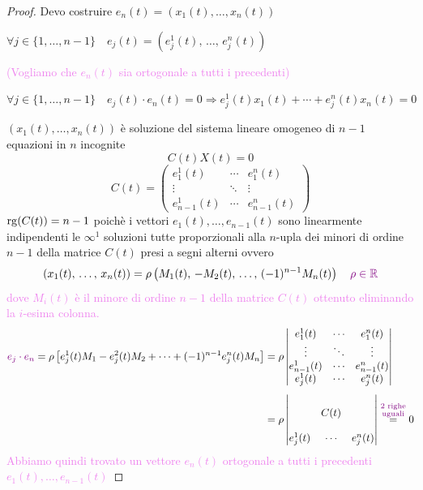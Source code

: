 \begin{proof}
        Devo costruire $e_n(t)=(x_1(t), \dots, x_n(t))$ 

        $\forall j \in \{1, \dots, n-1\} \quad e_j(t) = \left(e_j^1(t), \, \dots, \, e_j^n(t) \right)$

        \textcolor{violet}{(Vogliamo che $e_n(t)$ sia ortogonale a tutti i precedenti)} 
        
        $\forall j \in \{1, \dots, n-1\} \quad e_j(t) \cdot e_n(t) = 0 \Rightarrow e_j^1(t) x_1(t) + \cdots + e_j^n(t) x_n(t) = 0$

        $(x_1(t), \dots, x_n(t))$ è soluzione del sistema lineare omogeneo di $n-1$ equazioni in $n$ incognite
        \[ C(t)X(t)= 0 \]
        \[ C(t) = 
        \begin{pmatrix}
        e_1^1(t) & \cdots & e_1^n(t) \\
        \vdots & \ddots & \vdots \\
        e_{n-1}^1(t) & \cdots & e_{n-1}^n(t)
        \end{pmatrix}
        \]
        $\operatorname{rg}(C(t)) = n-1$ poichè i vettori $e_1(t), \dots, e_{n-1}(t)$ sono linearmente indipendenti le $\infty^1$ soluzioni tutte 
        proporzionali alla $n$-upla dei minori di ordine $n-1$ della matrice $C(t)$ presi a segni alterni ovvero
        \[ \left(x_1(t), \, \dots, \, x_n(t) \right) = \rho \left( M_1(t), \, -M_2(t), \, \dots, \, (-1)^{n-1} M_n(t) \right) \quad \textcolor{violet}{\rho \in \mathbb{R}} \]
        \textcolor{violet}{dove $M_i(t)$ è il minore di ordine $n-1$ della matrice $C(t)$ ottenuto eliminando la $i$-esima colonna.}
        \begin{align*}
        \textcolor{violet}{e_j \cdot e_n} =\rho \left[ e_j^1(t) M_1 - e_j^2(t) M_2 + \cdots + (-1)^{n-1} e_j^n(t) M_n \right] 
        &= \rho \begin{vmatrix}
        e_1^1(t) & \cdots & e_1^n(t) \\
        \vdots & \ddots & \vdots \\
        e_{n-1}^1(t) & \cdots & e_{n-1}^n(t) \\
        e_j^1(t) & \cdots & e_j^n(t)
        \end{vmatrix} \\[1ex]
        &= \rho \begin{vmatrix}
        &  &  \\
        & C(t) &  \\
        &  &  \\
        e_j^1(t) & \cdots & e_j^n(t)
        \end{vmatrix} \overset{\textcolor{violet}{\substack{\text{2 righe} \\ \text{uguali}}}}{=} 0
        \end{align*}
        \textcolor{violet}{Abbiamo quindi trovato un vettore $e_n(t)$ ortogonale a tutti i precedenti $e_1(t), \dots, e_{n-1}(t)$}


\end{proof}
